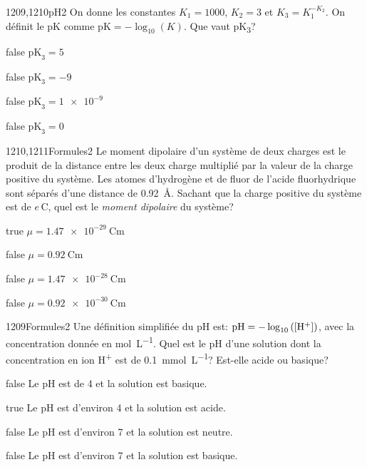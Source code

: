 \documentclass[11pt]{article}
\begin{document}
        \begin{question}{1209,1210}{pH}{2}{}
			On donne les constantes $K_1 = 1000$, $K_2 = 3$ et $K_3 = K_1^{-K_2}$. On définit le pK comme $\text{pK} = -\log_{10}\left(K\right)$. Que vaut pK\textsubscript{3}?
        \end{question}
        \begin{reponses}
    	    \item[false] $\text{pK}_3 = 5$    
    	    \item[false] $\text{pK}_3 = -9$
    	    \item[false] $\text{pK}_3 = \num{1e-9}$
    	    \item[false] $\text{pK}_3 = 0$
        \end{reponses}
        
        \begin{question}{1210,1211}{Formules}{2}{}
			Le moment dipolaire d'un système de deux charges est le produit de la distance entre les deux charge multiplié par la valeur de la charge positive du système. Les atomes d'hydrogène et de fluor de l'acide fluorhydrique sont séparés d'une distance de \SI{0.92}{\angstrom}. Sachant que la charge positive du système est de $e\,\si{\coulomb}$, quel est le \emph{moment dipolaire} du système?
        \end{question}
        \begin{reponses}
    	    \item[true] $\mu = \SI{1.47e-29}{\coulomb\meter}$
    	    \item[false] $\mu = \SI{0.92}{\coulomb\meter}$
    	    \item[false] $\mu = \SI{1.47e-28}{\coulomb\meter}$
    	    \item[false] $\mu = \SI{0.92e-30}{\coulomb\meter}$
        \end{reponses}
		
		\begin{question}{1209}{Formules}{2}{}
			Une définition simplifiée du pH est: $\text{pH} = -\log_{10}\left(\text{[H\textsuperscript{+}]}\right)$, avec la concentration donnée en \si{\mol\per\liter}. Quel est le pH d'une solution dont la concentration en ion H\textsuperscript{+} est de \SI{0.1}{\milli\mol\per\liter}? Est-elle acide ou basique?
        \end{question}
        \begin{reponses}
    	    \item[false] Le pH est de \num{4} et la solution est basique.
    	    \item[true] Le pH est d'environ \num{4} et la solution est acide.
    	    \item[false] Le pH est d'environ \num{7} et la solution est neutre.
    	    \item[false] Le pH est d'environ \num{7} et la solution est basique.
        \end{reponses}
		
\end{document}
